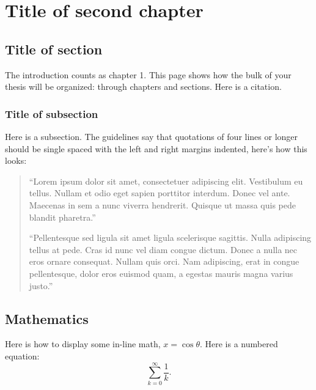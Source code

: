 \chapter{Title of second chapter}\label{CH_02}

\section{Title of section}
The introduction counts as chapter 1.  This page shows how the bulk of your thesis will be organized: through chapters and sections. Here is a citation.\cite{OBTMBD01}

\subsection{Title of subsection}
Here is a subsection.  The guidelines say that quotations of four lines or longer should be single spaced with the left and right margins indented, here's how this looks:\par

\singlespacing{}
\begin{quotation}
``Lorem ipsum dolor sit amet, consectetuer adipiscing elit.
Vestibulum eu tellus. Nullam et odio eget sapien porttitor
interdum. Donec vel ante. Maecenas in sem a nunc viverra
hendrerit. Quisque ut massa quis pede blandit pharetra.''

``Pellentesque sed ligula sit amet ligula scelerisque sagittis.
Nulla adipiscing tellus at pede. Cras id nunc vel diam congue
dictum. Donec a nulla nec eros ornare consequat. Nullam quis
orci. Nam adipiscing, erat in congue pellentesque, dolor eros
euismod quam, a egestas mauris magna varius justo.''
\end{quotation}
\doublespacing{}

\section{Mathematics}
Here is how to display some in-line math, $x=\cos\theta$. Here is a numbered equation:
\begin{equation} \label{eq:01}
	\sum\limits_{k=0}^{\infty}{\frac{1}{k}}.
\end{equation}
